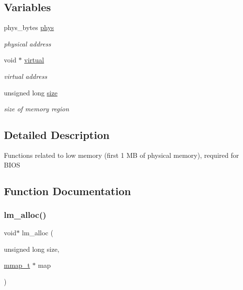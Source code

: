 \subsection*{Variables}
\begin{DoxyCompactItemize}
\item 
phys\+\_\+bytes \hyperlink{group__lmlib_gab7a85fe0db943529016cf606e3a7167f}{phys}
\begin{DoxyCompactList}\small\item\em physical address \end{DoxyCompactList}\item 
void $\ast$ \hyperlink{group__lmlib_ga6a0ea2231d30f2b025e0c4b9f12dd6db}{virtual}
\begin{DoxyCompactList}\small\item\em virtual address \end{DoxyCompactList}\item 
unsigned long \hyperlink{group__lmlib_ga1e1268d164c38e4f8a4f4eb9058b0601}{size}
\begin{DoxyCompactList}\small\item\em size of memory region \end{DoxyCompactList}\end{DoxyCompactItemize}


\subsection{Detailed Description}
Functions related to low memory (first 1 MB of physical memory), required for B\+I\+OS 

\subsection{Function Documentation}
\hypertarget{group__lmlib_gae45d971ce2ffcf4dc2677eba033a92cd}{}\label{group__lmlib_gae45d971ce2ffcf4dc2677eba033a92cd} 
\subsubsection{\texorpdfstring{lm\+\_\+alloc()}{lm\_alloc()}}
{\footnotesize\ttfamily void$\ast$ lm\+\_\+alloc (\begin{DoxyParamCaption}\item[{unsigned long}]{size,  }\item[{\hyperlink{structmmap__t}{mmap\+\_\+t} $\ast$}]{map }\end{DoxyParamCaption})}



